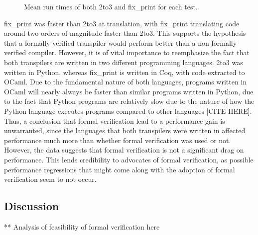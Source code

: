 \begin{figure*}[ht]
    \caption{Mean run times of both 2to3 and fix_print for each test.}
\end{figure*}


fix\_print was faster than 2to3 at translation, with fix\_print translating code around two orders of magnitude faster than 2to3. This supports the hypothesis that a formally verified transpiler would perform better than a non-formally verified compiler. However, it is of vital importance to reemphasize the fact that both transpilers are written in two different programming languages. 2to3 was written in Python, whereas fix\_print is written in Coq, with code extracted to OCaml. Due to the fundamental nature of both languages, programs written in OCaml will nearly always be faster than similar programs written in Python, due to the fact that Python programs are relatively slow due to the nature of how the Python language executes programs compared to other languages [CITE HERE]. Thus, a conclusion that formal verification lead to a performance gain is unwarranted, since the languages that both transpilers were written in affected performance much more than whether formal verification was used or not. However, the data suggests that formal verification is not a significant drag on performance. This lends credibility to advocates of formal verification, as possible performance regressions that might come along with the adoption of formal verification seem to not occur.

\subsection{Discussion}
** Analysis of feasibility of formal verification here
